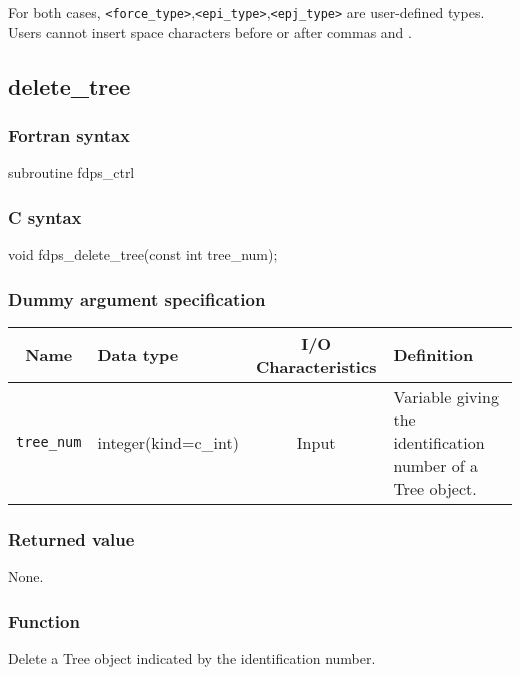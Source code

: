 For both cases, \verb|<force_type>|,\verb|<epi_type>|,\verb|<epj_type>| are user-defined types. Users cannot insert space characters before or after commas and {\setnoko{}}.
\clearpage

\subsection{delete\_tree}
\subsubsection*{Fortran syntax}
\begin{screen}
\begin{spverbatim}
subroutine fdps_ctrl%
\end{spverbatim}
\end{screen}

\subsubsection*{C syntax}
\begin{screen}
\begin{spverbatim}
void fdps_delete_tree(const int tree_num);
\end{spverbatim}
\end{screen}

\subsubsection*{Dummy argument specification}
\begin{table}[h]
\begin{tabularx}{\linewidth}{cXcX}
\toprule
\rowcolor{Snow2}
Name & Data type & I/O Characteristics & Definition \\
\midrule
\verb|tree_num| & integer(kind=c\_int) & Input & Variable giving the identification number of a Tree object. \\
\bottomrule
\end{tabularx}
\end{table}


\subsubsection*{Returned value}
None.


\subsubsection*{Function}
Delete a Tree object indicated by the identification number. \\
\clearpage

